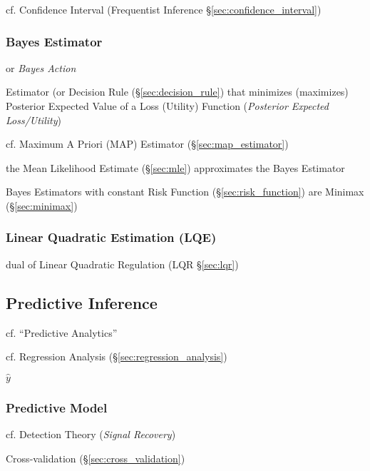 cf. Confidence Interval (Frequentist Inference \S\ref{sec:confidence_interval})



\subsubsection{Bayes Estimator}\label{sec:bayes_estimator}\hfill

or \emph{Bayes Action}

Estimator (or Decision Rule (\S\ref{sec:decision_rule}) that minimizes
(maximizes) Posterior Expected Value of a Loss (Utility) Function
(\emph{Posterior Expected Loss/Utility})

cf. Maximum A Priori (MAP) Estimator (\S\ref{sec:map_estimator})

the Mean Likelihood Estimate (\S\ref{sec:mle}) approximates the Bayes Estimator

Bayes Estimators with constant Risk Function (\S\ref{sec:risk_function}) are
Minimax (\S\ref{sec:minimax})



\subsubsection{Linear Quadratic Estimation (LQE)}\label{sec:lqe}

dual of Linear Quadratic Regulation (LQR \S\ref{sec:lqr})



\subsection{Predictive Inference}\label{sec:predictive_inference}

cf. ``Predictive Analytics''

\fist cf. Regression Analysis (\S\ref{sec:regression_analysis})

$\hat{y}$



\subsubsection{Predictive Model}\label{sec:predictive_model}

cf. Detection Theory (\emph{Signal Recovery}) %

Cross-validation (\S\ref{sec:cross_validation})




